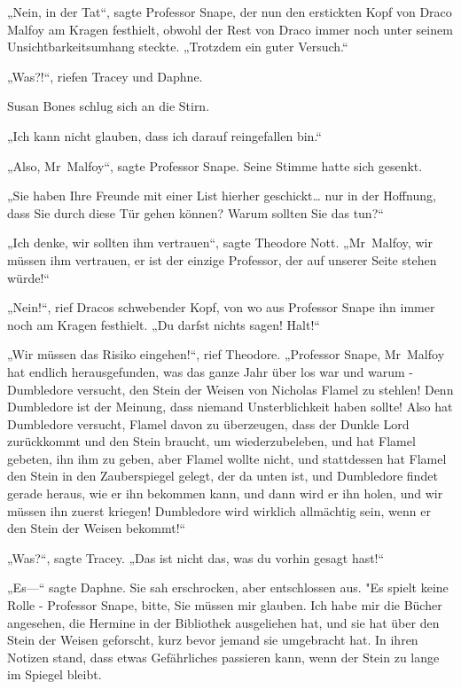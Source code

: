 {„Nein, in der Tat“, sagte Professor Snape, der nun den erstickten Kopf von Draco Malfoy am Kragen festhielt, obwohl der Rest von Draco immer noch unter seinem Unsichtbarkeitsumhang steckte. „Trotzdem ein guter Versuch.“

„Was?!“, riefen Tracey und Daphne.

Susan Bones schlug sich an die Stirn.

„Ich kann nicht glauben, dass ich darauf reingefallen bin.“

„Also, Mr~Malfoy“, sagte Professor Snape. Seine Stimme hatte sich gesenkt.

„Sie haben Ihre Freunde mit einer List hierher geschickt… nur in der Hoffnung, dass Sie durch diese Tür gehen können? Warum sollten Sie das tun?“

„Ich denke, wir sollten ihm vertrauen“, sagte Theodore Nott. „Mr~Malfoy, wir müssen ihm vertrauen, er ist der einzige Professor, der auf unserer Seite stehen würde!“

„Nein!“, rief Dracos schwebender Kopf, von wo aus Professor Snape ihn immer noch am Kragen festhielt. „Du darfst nichts sagen! Halt!“

„Wir müssen das Risiko eingehen!“, rief Theodore. „Professor Snape, Mr~Malfoy hat endlich herausgefunden, was das ganze Jahr über los war und warum - Dumbledore versucht, den Stein der Weisen von Nicholas Flamel zu stehlen! Denn Dumbledore ist der Meinung, dass niemand Unsterblichkeit haben sollte! Also hat Dumbledore versucht, Flamel davon zu überzeugen, dass der Dunkle Lord zurückkommt und den Stein braucht, um wiederzubeleben, und hat Flamel gebeten, ihn ihm zu geben, aber Flamel wollte nicht, und stattdessen hat Flamel den Stein in den Zauberspiegel gelegt, der da unten ist, und Dumbledore findet gerade heraus, wie er ihn bekommen kann, und dann wird er ihn holen, und wir müssen ihn zuerst kriegen! Dumbledore wird wirklich allmächtig sein, wenn er den Stein der Weisen bekommt!“

„Was?“, sagte Tracey. „Das ist nicht das, was du vorhin gesagt hast!“

„Es—“ sagte Daphne. Sie sah erschrocken, aber entschlossen aus. "Es spielt keine Rolle - Professor Snape, bitte, Sie müssen mir glauben. Ich habe mir die Bücher angesehen, die Hermine in der Bibliothek ausgeliehen hat, und sie hat über den Stein der Weisen geforscht, kurz bevor jemand sie umgebracht hat. In ihren Notizen stand, dass etwas Gefährliches passieren kann, wenn der Stein zu lange im Spiegel bleibt.

}
